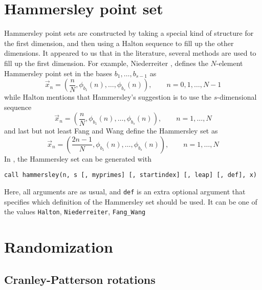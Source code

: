 \section{Hammersley point set}

Hammersley point sets are constructed by taking a special kind of structure for
the first dimension, and then using a Halton sequence to fill up the other
dimensions.  It appeared to us that in the literature, several methods are used
to fill up the first dimension.  For example, Niederreiter
\cite{niederreiter92}, defines the $N$-element Hammersley point set in the
bases $b_1,\dots,b_{s-1}$ as
\[
\vec{x}_n = \left(\frac{n}{N}, \phi_{b_1}(n), \dots, \phi_{b_s}(n)\right), \qquad n = 0, 1, \dots, N-1
\]
while Halton \cite{halton60} mentions that Hammersley's suggestion is to use
the $s$-dimensional sequence
\[
\vec{x}_n = \left(\frac{n}{N}, \phi_{b_1}(n), \dots, \phi_{b_s}(n)\right), \qquad n = 1, \dots, N
\]
and last but not least Fang and Wang define the Hammersley set as
\[
\vec{x}_n = \left(\frac{2n-1}{N}, \phi_{b_1}(n), \dots, \phi_{b_s}(n)\right), \qquad n = 1, \dots, N
\]
In \qmcpack{}, the Hammersley set can be generated with
\begin{lstlisting}
call hammersley(n, s [, myprimes] [, startindex] [, leap] [, def], x)
\end{lstlisting}
Here, all arguments are as usual, and \verb!def! is an extra optional argument
that specifies which definition of the Hammersley set should be used.  It can be
one of the values \verb!Halton!, \verb!Niederreiter!, \verb!Fang_Wang!

\section{Randomization}

\subsection{Cranley-Patterson rotations}


